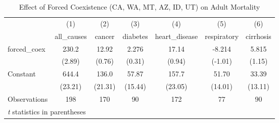 \documentclass[12pt]{article}
\begin{document}
\begin{table}[htbp]\centering \caption{Effect of Forced Coexistence (CA, WA, MT, AZ, ID, UT) on Adult Mortality\label{adult4}} \begin{tabular}{l*{6}{c}} \toprule
                    &\multicolumn{1}{c}{(1)}&\multicolumn{1}{c}{(2)}&\multicolumn{1}{c}{(3)}&\multicolumn{1}{c}{(4)}&\multicolumn{1}{c}{(5)}&\multicolumn{1}{c}{(6)}\\
                    &\multicolumn{1}{c}{all\_causes}&\multicolumn{1}{c}{cancer}&\multicolumn{1}{c}{diabetes}&\multicolumn{1}{c}{heart\_disease}&\multicolumn{1}{c}{respiratory}&\multicolumn{1}{c}{cirrhosis}\\
\midrule
forced\_coex         &       230.2&       12.92&       2.276&       17.14&      -8.214&       5.815\\
                    &      (2.89)&      (0.76)&      (0.31)&      (0.94)&     (-1.01)&      (1.15)\\
\addlinespace
Constant            &       644.4&       136.0&       57.87&       157.7&       51.70&       33.39\\
                    &     (23.21)&     (21.31)&     (15.44)&     (23.05)&     (14.01)&     (13.11)\\
\midrule
Observations        &         198&         170&          90&         172&          77&          90\\
\bottomrule
\multicolumn{7}{l}{\footnotesize \textit{t} statistics in parentheses}\\
\end{tabular}
\end{table}
\end{document}

